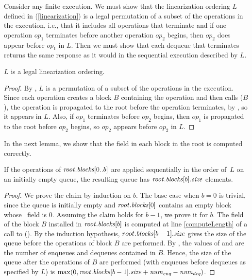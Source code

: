 Consider any finite execution.  We must show that the linearization ordering $L$ defined in 
(\ref{linearization}) is a legal permutation of a subset of the operations in 
the execution, i.e., that it includes all operations that terminate and 
if one operation $op_1$ terminates before another operation $op_2$ begins, then $op_2$ does appear
before $op_1$ in $L$.  Then we must show that each dequeue that terminates returns the 
same response as it would in the sequential execution described by $L$.

\begin{lemma} \label{linearSat}
$L$ is a legal linearization ordering.
\end{lemma}
\begin{proof}
By , $L$ is a permutation of a subset of the operations in the execution.
Since each operation creates a block $B$ containing the operation and then calls ($B$), 
the operation is propagated to the root before the operation terminates, by ,
so it appears in $L$.
Also, if $op_{1}$ terminates before $op_{2}$ begins, then $op_{1}$ 
is propagated to the root before $op_2$ begins, so $op_2$ appears before $op_2$ in $L$.
\end{proof}

In the next lemma, we show that the  field in each block in the root is computed correctly.
\begin{lemma}\label{sizeCorrectness}
If the operations of $\mbox{\textnormal{\textit{root}}}.\mbox{\textit{blocks}}[0..b]$ are applied sequentially in the order of~$L$ on an initially empty queue, the resulting queue has $\mbox{\textnormal{\textit{root}}}.\mbox{\textit{blocks}}[b].\mbox{\textit{size}}$ elements.  
\end{lemma}
\begin{proof}
We prove the claim by induction on $b$. 
The base case when ${b=0}$ is trivial, since the queue is initially empty and 
$\mbox{\textnormal{\textit{root}}}.\mbox{\textit{blocks}}[0]$ contains an empty block whose \size\ field is $0$. 
Assuming the claim holds for $b-1$, we prove it for $b$.
The  field of the block $B$ installed in $\mbox{\textnormal{\textit{root}}}.\mbox{\textit{blocks}}[b]$ is computed
at line \ref{computeLength} of a call to ().
By the induction hypothesis, $root.\mbox{\textit{blocks}}[b-1].\mbox{\textit{size}}$ gives the size of the queue before the operations
of block $B$ are performed.
By , the values of  and 
are the number of enqueues and dequeues contained in $B$.
Hence, the size of the queue after the operations of $B$ are performed (with enqueues before dequeues as specified by $L$)
is $\max(0, \mbox{\textnormal{\textit{root}}}.\mbox{\textit{blocks}}[b-1].\mbox{\textit{size}} + \mbox{\textnormal{\textit{num\textsubscript{enq}}}} - \mbox{\textnormal{\textit{num\textsubscript{deq}}}})$.
\end{proof}

